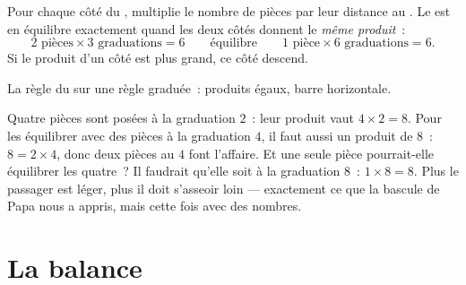 \begin{proposition}\label{prop:g3:levers-and-scales:rule}
Pour chaque côté du , multiplie le nombre de pièces par leur
distance au . Le  est en équilibre exactement quand les
deux côtés donnent le \emph{même produit}~:
\[
2 \text{ pièces} \times 3 \text{ graduations} = 6
\qquad\text{équilibre}\qquad
1 \text{ pièce} \times 6 \text{ graduations} = 6 .
\]
Si le produit d'un côté est plus grand, ce côté descend.
\end{proposition}

\begin{omfigure}

{\small La règle du  sur une règle graduée~: produits égaux,
barre horizontale.}
\end{omfigure}

\begin{example}\label{ex:g3:levers-and-scales:using}
Quatre pièces sont posées à la graduation $2$~: leur produit vaut
$4 \times 2 = 8$. Pour les équilibrer avec des pièces à la graduation
$4$, il faut aussi un produit de $8$~: $8 = 2 \times 4$, donc deux
pièces au $4$ font l'affaire. Et une seule pièce pourrait-elle
équilibrer les quatre~? Il faudrait qu'elle soit à la graduation
$8$~: $1 \times 8 = 8$. Plus le passager est léger, plus il doit
s'asseoir loin --- exactement ce que la bascule de Papa nous a
appris, mais cette fois avec des nombres.
\end{example}

\section{La balance}

